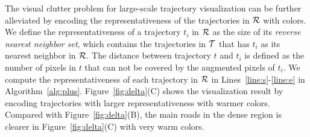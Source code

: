






The visual clutter problem for large-scale trajectory visualization can be further alleviated by encoding the representativeness of the trajectories in $\mathcal{R}$ with colors.
We define the representativeness of a trajectory $t_i$ in $\mathcal{R}$ as the size of its \emph{reverse nearest neighbor set}, which contains the trajectories in $\mathcal{T}$ that has $t_i$ as its nearest neighbor in $\mathcal{R}$.
The distance between trajectory $t$ and $t_i$ is defined as the number of pixels in $t$ that can not be covered by the augmented pixels of $t_i$.
We compute the representativeness of each trajectory in $\mathcal{R}$ in Lines~\ref{line:s}-\ref{line:e} in Algorithm~\ref{alg:plus}.
Figure~\ref{fig:delta}(C) shows the visualization result by encoding trajectories with larger representativeness with warmer colors. Compared with Figure~\ref{fig:delta}(B), the main roads in the dense region is clearer in Figure~\ref{fig:delta}(C) with very warm colors.










